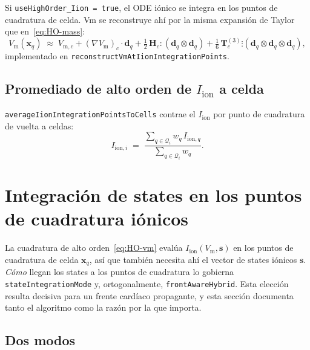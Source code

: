 \documentclass[11pt,a4paper]{article}
\newcommand{\code}[1]{\texttt{\small #1}}
\newcommand{\Vm}{V_{\text{m}}}
\newcommand{\Iion}{I_{\mathrm{ion}}}
\newcommand{\grad}{\nabla}
\newcommand{\Vmsub}[1]{V_{\text{m},#1}}
\newcommand{\Iionsub}[1]{I_{\mathrm{ion},#1}}
\newcommand{\dictkey}[1]{\textcolor{black!60!green}{\texttt{\footnotesize #1}}}
\begin{document}
Si \code{useHighOrder\_Iion = true}, el ODE iónico se integra en los puntos de
cuadratura de celda. Vm se reconstruye ahí por la misma expansión de Taylor que
en~\eqref{eq:HO-mass}:
\begin{equation}
  \Vm(\mathbf{x}_{q})
   \;\approx\;
   \Vmsub{c} + (\grad \Vm)_{c} \cdot \mathbf{d}_{q}
   + \tfrac{1}{2}\, \mathbf{H}_{c} \!:\! (\mathbf{d}_{q} \otimes \mathbf{d}_{q})
   + \tfrac{1}{6}\, \mathbf{T}^{(3)}_{c} \!\vdots\!
       (\mathbf{d}_{q} \otimes \mathbf{d}_{q} \otimes \mathbf{d}_{q}),
   \label{eq:HO-vm}
\end{equation}
implementado en \code{reconstructVmAtIionIntegrationPoints}.

\subsection{Promediado de alto orden de $\Iion$ a celda}

\code{averageIionIntegrationPointsToCells} contrae el $\Iion$ por punto de
cuadratura de vuelta a celdas:
\begin{equation}
  \Iionsub{i} \;=\;
   \frac{\sum_{q \in \mathcal{Q}_{i}} w_{q}\, \Iionsub{q}}
        {\sum_{q \in \mathcal{Q}_{i}} w_{q}}.
\end{equation}

\section{Integración de states en los puntos de cuadratura iónicos}
\label{sec:stateint}

La cuadratura de alto orden~\eqref{eq:HO-vm} evalúa $\Iion(\Vm,\mathbf{s})$ en los
puntos de cuadratura de celda $\mathbf{x}_q$, así que también necesita ahí el
vector de states iónicos $\mathbf{s}$. \emph{Cómo} llegan los states a los puntos
de cuadratura lo gobierna \dictkey{stateIntegrationMode} y, ortogonalmente,
\dictkey{frontAwareHybrid}. Esta elección resulta decisiva para un frente cardíaco
propagante, y esta sección documenta tanto el algoritmo como la razón por la que
importa.

\subsection{Dos modos}
\end{document}
